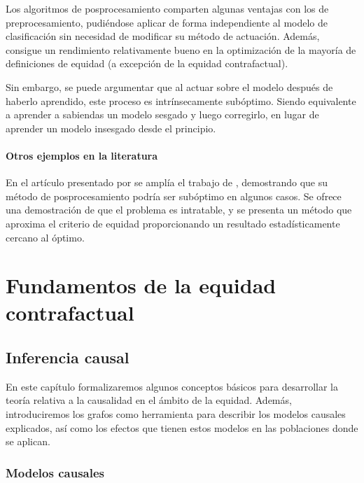 \documentclass[oneside,openright,titlepage,numbers=noenddot,openany,headinclude,footinclude=true,
cleardoublepage=empty,abstractoff,BCOR=5mm,paper=a4,fontsize=12pt,main=spanish]{scrreprt}
\begin{document}
Los algoritmos de posprocesamiento comparten algunas ventajas con los de preprocesamiento, pudiéndose aplicar de forma independiente al modelo de clasificación sin necesidad de modificar su método de actuación. Además, consigue un rendimiento relativamente bueno en la optimización de la mayoría de definiciones de equidad (a excepción de la  equidad contrafactual).

Sin embargo, se puede argumentar que al actuar sobre el modelo después de haberlo aprendido, este proceso es intrínsecamente subóptimo. Siendo equivalente a aprender a sabiendas un modelo sesgado y luego corregirlo, en lugar de aprender un modelo insesgado desde el principio.

\subsection*{Otros ejemplos en la literatura}

En el artículo presentado por \cite{woodworth2017} se amplía el trabajo de \cite{eodd2016}, demostrando que su método de posprocesamiento podría ser subóptimo en algunos casos. Se ofrece una demostración de que el problema es intratable, y se presenta un método que aproxima el criterio de equidad proporcionando un resultado estadísticamente cercano al óptimo.

\part{Fundamentos de la equidad contrafactual} \label{part:fundamentoseqcontra}

\chapter{Inferencia causal} \label{ch:inferenciacau}

En este capítulo formalizaremos algunos conceptos básicos para desarrollar la teoría relativa a la causalidad en el ámbito de la equidad. Además, introduciremos los grafos como herramienta para describir los modelos causales explicados, así como los efectos que tienen estos modelos en las poblaciones donde se aplican.

\section{Modelos causales}
\end{document}
